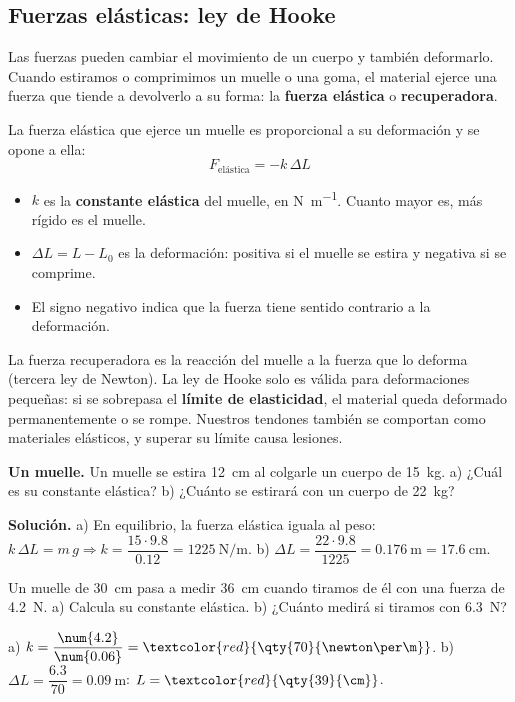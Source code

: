\subsection{Fuerzas elásticas: ley de Hooke}

Las fuerzas pueden cambiar el movimiento de un cuerpo y también deformarlo. Cuando estiramos o comprimimos un muelle o una goma, el
material ejerce una fuerza que tiende a devolverlo a su forma: la \textbf{fuerza elástica} o \textbf{recuperadora}.

\begin{definition}
    La fuerza elástica que ejerce un muelle es proporcional a su deformación y se opone a ella:
    \[ F_{\text{elástica}} = -k\,\Delta L \]
    \begin{itemize}
        \item \(k\) es la \textbf{constante elástica} del muelle, en \unit{\newton\per\m}. Cuanto mayor es, más rígido es el muelle.
        \item \(\Delta L = L - L_0\) es la deformación: positiva si el muelle se estira y negativa si se comprime.
        \item El signo negativo indica que la fuerza tiene sentido contrario a la deformación.
    \end{itemize}
\end{definition}

La fuerza recuperadora es la reacción del muelle a la fuerza que lo deforma (tercera ley de Newton). La ley de Hooke solo es válida
para deformaciones pequeñas: si se sobrepasa el \textbf{límite de elasticidad}, el material queda deformado permanentemente o se
rompe. Nuestros tendones también se comportan como materiales elásticos, y superar su límite causa lesiones.

\begin{example}
    \textbf{Un muelle.} Un muelle se estira \qty{12}{\cm} al colgarle un cuerpo de \qty{15}{\kg}. a) ¿Cuál es su constante elástica?
    b) ¿Cuánto se estirará con un cuerpo de \qty{22}{\kg}?

    \textbf{Solución.} a) En equilibrio, la fuerza elástica iguala al peso: \(k\,\Delta L = m\,g \Rightarrow k = \dfrac{15 \cdot \num{9.8}}{\num{0.12}}
    = \qty{1225}{\newton\per\m}\). b) \(\Delta L = \dfrac{22 \cdot \num{9.8}}{1225} = \qty{0.176}{\m} = \qty{17.6}{\cm}\).
\end{example}

\begin{exercise}
    Un muelle de \qty{30}{\cm} pasa a medir \qty{36}{\cm} cuando tiramos de él con una fuerza de \qty{4.2}{\newton}. a) Calcula su
    constante elástica. b) ¿Cuánto medirá si tiramos con \qty{6.3}{\newton}?
    \begin{solu}
        a) \(k = \dfrac{\num{4.2}}{\num{0.06}} = \textcolor{red}{\qty{70}{\newton\per\m}}\). b) \(\Delta L = \dfrac{\num{6.3}}{70} =
        \qty{0.09}{\m}\): \(L = \textcolor{red}{\qty{39}{\cm}}\).
    \end{solu}
\end{exercise}

